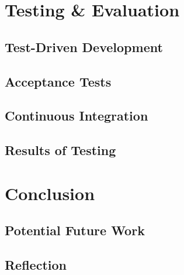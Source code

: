 \documentclass[11pt]{book}
\begin{document}
\chapter{Testing \& Evaluation}
\label{testeval}
\section{Test-Driven Development}
\section{Acceptance Tests}
\section{Continuous Integration}
\section{Results of Testing}

\chapter{Conclusion}


\section{Potential Future Work}

\section{Reflection}

\printbibliography
\end{document}
